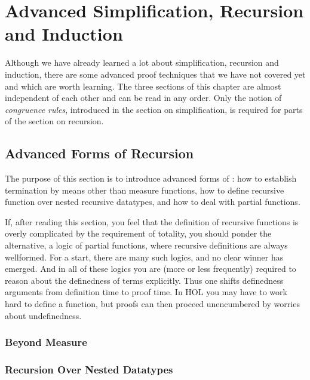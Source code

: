 \chapter{Advanced Simplification, Recursion and Induction}

Although we have already learned a lot about simplification, recursion and
induction, there are some advanced proof techniques that we have not covered
yet and which are worth learning. The three sections of this chapter are almost
independent of each other and can be read in any order. Only the notion of
\emph{congruence rules}, introduced in the section on simplification, is
required for parts of the section on recursion.



\section{Advanced Forms of Recursion}

The purpose of this section is to introduce advanced forms of
: how to establish termination by means other than measure
functions, how to define recursive function over nested recursive datatypes,
and how to deal with partial functions.

If, after reading this section, you feel that the definition of recursive
functions is overly complicated by the requirement of
totality, you should ponder the alternative, a logic of partial functions,
where recursive definitions are always wellformed. For a start, there are many
such logics, and no clear winner has emerged. And in all of these logics you
are (more or less frequently) required to reason about the definedness of
terms explicitly. Thus one shifts definedness arguments from definition time to
proof time. In HOL you may have to work hard to define a function, but proofs
can then proceed unencumbered by worries about undefinedness.

\subsection{Beyond Measure}
\label{sec:beyond-measure}


\subsection{Recursion Over Nested Datatypes}
\label{sec:nested-recdef}




